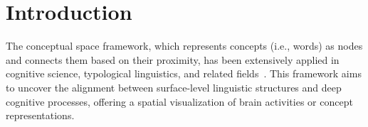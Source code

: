 \section{Introduction}
\label{introduction}


The conceptual space framework, which represents concepts (i.e., words) as nodes and connects them based on their proximity, has been extensively applied in cognitive science, typological linguistics, and related fields~\cite{gardenfors2000conceptual,gardenfors2014geometry,nosofsky1986attention,nosofsky1987attention,nosofsky1992similarity,shepard1964attention,shepard1987universal,croft2003typology,haspelmath2003geometry}. This framework aims to uncover the alignment between surface-level linguistic structures and deep cognitive processes, offering a spatial visualization of brain activities or concept representations.


